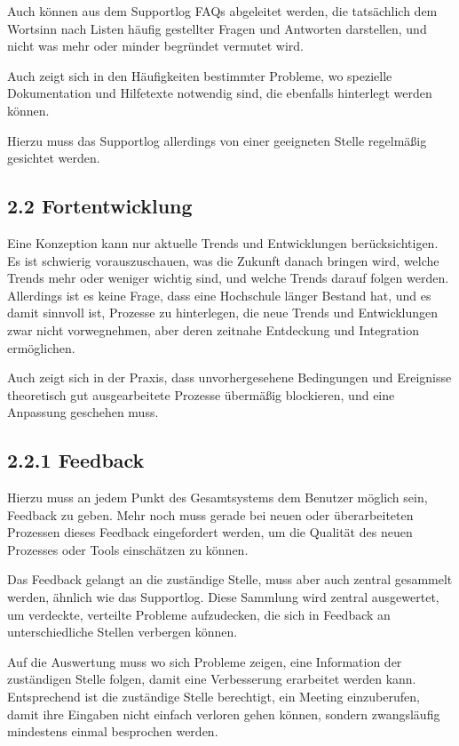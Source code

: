 \documentclass[a4paper]{article}
\begin{document}
{\sffamily
Auch können aus dem Supportlog FAQs abgeleitet werden, die tatsächlich dem Wortsinn nach Listen häufig gestellter Fragen
und Antworten darstellen, und nicht was mehr oder minder begründet vermutet wird.}

{\sffamily
Auch zeigt sich in den Häufigkeiten bestimmter Probleme, wo spezielle Dokumentation und Hilfetexte notwendig sind, die
ebenfalls hinterlegt werden können.}

{\sffamily
Hierzu muss das Supportlog allerdings von einer geeigneten Stelle regelmäßig gesichtet werden.}

\subsection{2.2 Fortentwicklung}
{\sffamily
Eine Konzeption kann nur aktuelle Trends und Entwicklungen berücksichtigen. Es ist schwierig vorauszuschauen, was die
Zukunft danach bringen wird, welche Trends mehr oder weniger wichtig sind, und welche Trends darauf folgen werden.
Allerdings ist es keine Frage, dass eine Hochschule länger Bestand hat, und es damit sinnvoll ist, Prozesse zu
hinterlegen, die neue Trends und Entwicklungen zwar nicht vorwegnehmen, aber deren zeitnahe Entdeckung und Integration
ermöglichen.}

{\sffamily
Auch zeigt sich in der Praxis, dass unvorhergesehene Bedingungen und Ereignisse theoretisch gut ausgearbeitete Prozesse
übermäßig blockieren, und eine Anpassung geschehen muss.}

\subsection{2.2.1 Feedback}
{\sffamily
Hierzu muss an jedem Punkt des Gesamtsystems dem Benutzer möglich sein, Feedback zu geben. Mehr noch muss gerade bei
neuen oder überarbeiteten Prozessen dieses Feedback eingefordert werden, um die Qualität des neuen Prozesses oder Tools
einschätzen zu können.}

{\sffamily
Das Feedback gelangt an die zuständige Stelle, muss aber auch zentral gesammelt werden, ähnlich wie das Supportlog.
Diese Sammlung wird zentral ausgewertet, um verdeckte, verteilte Probleme aufzudecken, die sich in Feedback an
unterschiedliche Stellen verbergen können.}

{\sffamily
Auf die Auswertung muss wo sich Probleme zeigen, eine Information der zuständigen Stelle folgen, damit eine Verbesserung
erarbeitet werden kann. Entsprechend ist die zuständige Stelle berechtigt, ein Meeting einzuberufen, damit ihre
Eingaben nicht einfach verloren gehen können, sondern zwangsläufig mindestens einmal besprochen werden.}
\end{document}
